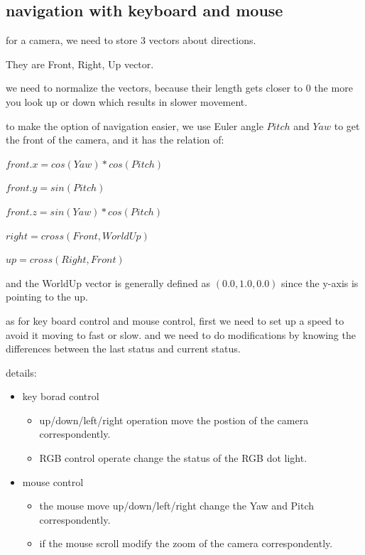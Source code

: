 \documentclass[acmtog]{acmart}
\begin{document}
\subsection{navigation with keyboard and mouse}

for a camera, we need to store 3 vectors about directions.

They are Front, Right, Up vector.

we need to normalize the vectors, because their length gets closer to 0 the more you look up or down which results in slower movement.

to make the option of navigation easier, we use Euler angle \(Pitch\) and \(Yaw\) to get the front of the camera, and it has the relation of:

\(front.x = cos(Yaw) * cos(Pitch)\)

\(front.y = sin(Pitch)\)

\(front.z = sin(Yaw) * cos(Pitch)\)

\(right = cross(Front, WorldUp)\)

\(up = cross(Right, Front)\)

and the WorldUp vector is generally defined as \((0.0, 1.0, 0.0)\) since the y-axis is pointing to the up.

as for key board control and mouse control, first we need to set up a speed to avoid it moving to fast or slow.
and we need to do modifications by knowing the differences between the last status and current status.

details:
\begin{itemize}
	\item key borad control
	\begin{itemize}
	\item up/down/left/right operation
	move the postion of the camera correspondently.

	\item RGB control operate
	change the status of the RGB dot light.
	\end{itemize}

	\item  mouse control
	\begin{itemize}
	\item the mouse move up/down/left/right
	change the Yaw and Pitch correspondently.
	
	\item if the mouse scroll
	modify the zoom of the camera correspondently.
	\end{itemize}

\end{itemize}
\end{document}

